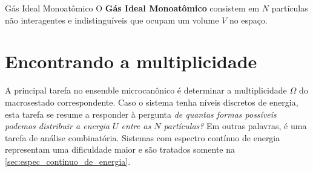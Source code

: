     \begin{statementbox}{Gás Ideal Monoatômico}
        O \textbf{Gás Ideal Monoatômico} consistem em $N$ partículas não interagentes e indistinguíveis que ocupam um volume $V$ no espaço.
    \end{statementbox}

\section{Encontrando a multiplicidade}

    A principal tarefa no ensemble microcanônico é determinar a multiplicidade $\Omega$ do macrosestado correspondente. Caso o sistema tenha níveis discretos de energia, esta tarefa se resume a responder à pergunta \textit{de quantas formas possíveis podemos distribuir a energia $U$ entre as $N$ partículas?} Em outras palavras, é uma tarefa de análise combinatória. Sistemas com espectro contínuo de energia representam uma dificuldade maior e são tratados somente na \cref{sec:espec_continuo_de_energia}.

